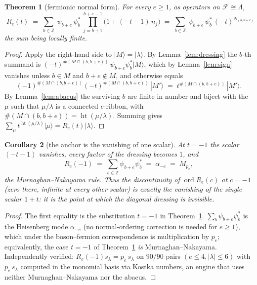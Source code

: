 \documentclass[11pt]{article}
\newtheorem{theorem}{Theorem}
\newtheorem{corollary}[theorem]{Corollary}
\theoremstyle{definition}
\DeclareMathOperator{\ord}{ord}
\newcommand{\hgt}{\operatorname{ht}}          %
\newcommand{\Z}{\mathbb{Z}}
\newcommand{\Lam}{\Lambda}
\newcommand{\F}{\mathcal{F}}
\newcommand{\Mult}[1]{M_{#1}}
\begin{document}
\begin{theorem}[fermionic normal form]\label{thm:main}
For every $e\ge1$, as operators on $\F\cong\Lam$,
\[
  \boxed{\;R_e(t)\;=\;\sum_{b\in\Z}\ \psi_{b+e}\,\psi_b^{*}\ \prod_{j=b+1}^{b+e-1}
      \bigl(1+(-t-1)\,n_j\bigr)
   \;=\;\sum_{b\in\Z}\ \psi_{b+e}\,\psi_b^{*}\,(-t)^{N_{(b,b+e)}} \; }
\]
the sum being locally finite.
\end{theorem}

\begin{proof}
Apply the right-hand side to $|M\rangle=|\lambda\rangle$.  By
Lemma~\ref{lem:dressing} the $b$-th summand is
$(-t)^{\#(M\cap(b,b+e))}\,\psi_{b+e}\psi_b^{*}|M\rangle$, which by
Lemma~\ref{lem:sign} vanishes unless $b\in M$ and $b+e\notin M$, and otherwise
equals
\[
 (-1)^{\#(M\cap(b,b+e))}(-t)^{\#(M\cap(b,b+e))}\,|M'\rangle
 \;=\; t^{\#(M\cap(b,b+e))}\,|M'\rangle .
\]
By Lemma~\ref{lem:abacus} the surviving $b$ are finite in number and biject with
the $\mu$ such that $\mu/\lambda$ is a connected $e$-ribbon, with
$\#(M\cap(b,b+e))=\hgt(\mu/\lambda)$.  Summing gives
$\sum_\mu t^{\hgt(\mu/\lambda)}|\mu\rangle=R_e(t)|\lambda\rangle$.
\end{proof}

\begin{corollary}[the anchor is the vanishing of one scalar]\label{cor:C1}
At $t=-1$ the scalar $(-t-1)$ vanishes, every factor of the dressing becomes $1$,
and
\[
 R_e(-1)\;=\;\sum_{b\in\Z}\psi_{b+e}\psi_b^{*}\;=\;\alpha_{-e}\;=\;\Mult{p_e},
\]
the Murnaghan--Nakayama rule.  Thus the discontinuity of $\ord R_e(c)$ at $c=-1$
(zero there, infinite at every other scalar) is exactly the vanishing of the single
scalar $1+t$: it is the point at which the diagonal dressing is invisible.
\end{corollary}

\begin{proof}
The first equality is the substitution $t=-1$ in Theorem~\ref{thm:main}.
$\sum_b\psi_{b+e}\psi_b^{*}$ is the Heisenberg mode $\alpha_{-e}$ (no
normal-ordering correction is needed for $e\ge1$), which under the boson--fermion
correspondence is multiplication by $p_e$; equivalently, the case $t=-1$ of
Theorem~\ref{thm:main} \emph{is} Murnaghan--Nakayama.  Independently verified:
$R_e(-1)s_\lambda=p_e\,s_\lambda$ on $90/90$ pairs $(e\le4,|\lambda|\le6)$ with
$p_e\,s_\lambda$ computed in the monomial basis via Kostka numbers, an engine that
uses neither Murnaghan--Nakayama nor the abacus.
\end{proof}
\end{document}

